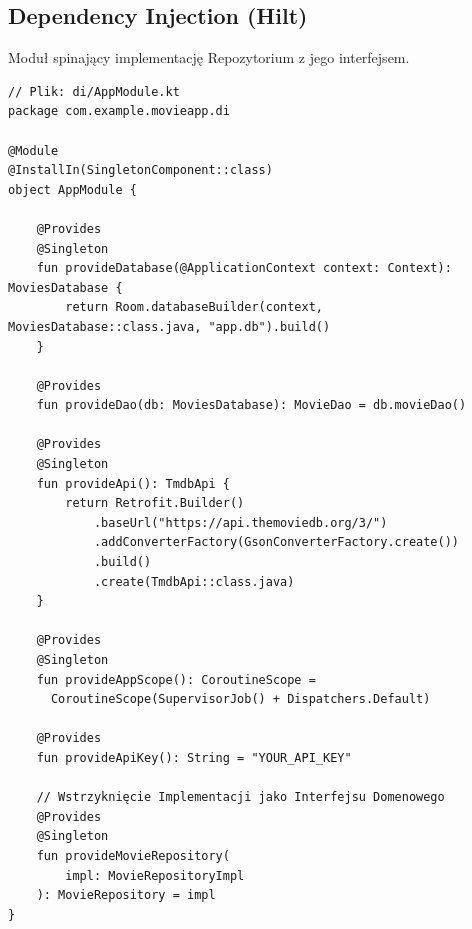\subsection{Dependency Injection (Hilt)}

Moduł spinający implementację Repozytorium z jego interfejsem.

\begin{verbatim}
// Plik: di/AppModule.kt
package com.example.movieapp.di

@Module
@InstallIn(SingletonComponent::class)
object AppModule {

    @Provides
    @Singleton
    fun provideDatabase(@ApplicationContext context: Context): MoviesDatabase {
        return Room.databaseBuilder(context, MoviesDatabase::class.java, "app.db").build()
    }

    @Provides
    fun provideDao(db: MoviesDatabase): MovieDao = db.movieDao()

    @Provides
    @Singleton
    fun provideApi(): TmdbApi {
        return Retrofit.Builder()
            .baseUrl("https://api.themoviedb.org/3/")
            .addConverterFactory(GsonConverterFactory.create())
            .build()
            .create(TmdbApi::class.java)
    }

    @Provides
    @Singleton
    fun provideAppScope(): CoroutineScope = 
      CoroutineScope(SupervisorJob() + Dispatchers.Default)

    @Provides
    fun provideApiKey(): String = "YOUR_API_KEY"

    // Wstrzyknięcie Implementacji jako Interfejsu Domenowego
    @Provides
    @Singleton
    fun provideMovieRepository(
        impl: MovieRepositoryImpl
    ): MovieRepository = impl
}
\end{verbatim}


